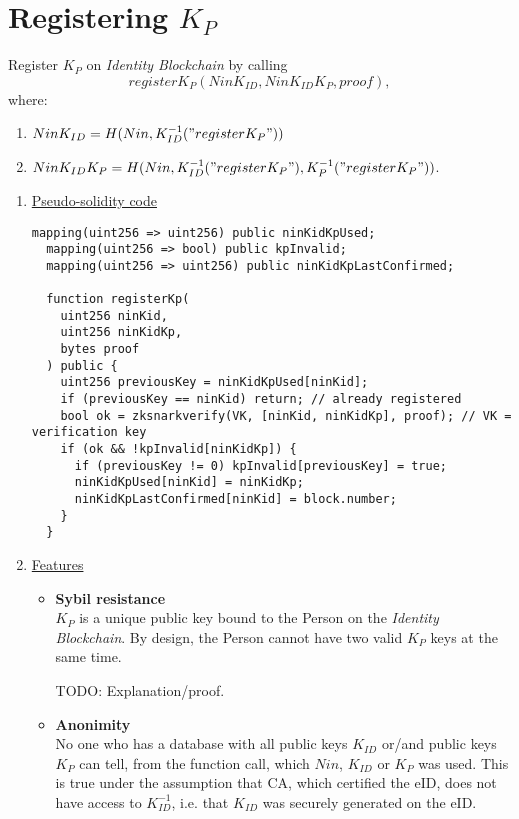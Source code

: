 \documentclass{article}
\newcommand{\khk}{K_{P}}
\newcommand{\kid}{K_{ID}}
\newcommand{\pbc}{\textit{Identity Blockchain}}
\begin{document}
\section{Registering $\khk$}
Register $\khk$ on \pbc{} by calling $$register\khk(Nin\kid, Nin\kid\khk, proof),$$
  where:
    \begin{enumerate}
      \item[] $Nin\kid=H(Nin,\kid^{-1}("register\khk"))$
      \item[] $Nin\kid\khk=H(Nin, \kid^{-1}("register\khk"), \khk^{-1}("register\khk"))$.
    \end{enumerate}
\begin{enumerate}[leftmargin=0cm]
\item[] \underline{Pseudo-solidity code}

\hfill\begin{minipage}{\dimexpr\textwidth-20px}
\begin{lstlisting}[language=Solidity]
  mapping(uint256 => uint256) public ninKidKpUsed;
  mapping(uint256 => bool) public kpInvalid;
  mapping(uint256 => uint256) public ninKidKpLastConfirmed;

  function registerKp(
    uint256 ninKid,
    uint256 ninKidKp,
    bytes proof
  ) public {
    uint256 previousKey = ninKidKpUsed[ninKid];
    if (previousKey == ninKid) return; // already registered
    bool ok = zksnarkverify(VK, [ninKid, ninKidKp], proof); // VK = verification key
    if (ok && !kpInvalid[ninKidKp]) {
      if (previousKey != 0) kpInvalid[previousKey] = true;
      ninKidKpUsed[ninKid] = ninKidKp;
      ninKidKpLastConfirmed[ninKid] = block.number;
    }
  }
\end{lstlisting}
\xdef\tpd{\the\prevdepth}
\end{minipage}
\item[] \underline{Features}
\begin{itemize}
      \item[] \textbf{Sybil resistance} \\ $\khk$ is a unique public key bound to the Person on the \pbc{}. By design, the Person cannot have two valid $\khk$ keys at the same time.

      TODO: Explanation/proof.
      \vspace{5px}
    \item[] \textbf{Anonimity} \\ No one who has a database with all public keys $\kid$ or/and public keys $\khk$ can tell, from the function call, which $Nin$, $\kid$ or $\khk$ was used. This is true under the assumption that CA, which certified the eID, does not have access to $\kid^{-1}$, i.e. that $\kid$ was securely generated on the eID.


\end{itemize}
\end{enumerate}
\end{document}

